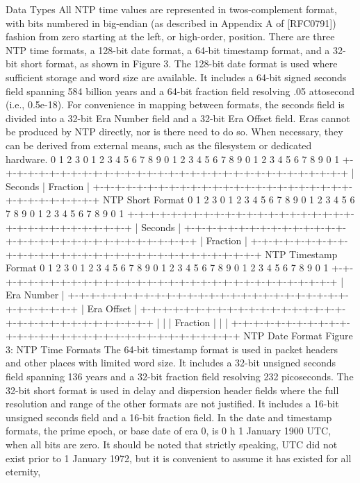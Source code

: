  Data Types
 All NTP time values are represented in twos-complement format, with
 bits numbered in big-endian (as described in Appendix A of [RFC0791])
 fashion from zero starting at the left, or high-order, position.
 There are three NTP time formats, a 128-bit date format, a 64-bit
 timestamp format, and a 32-bit short format, as shown in Figure 3.
 The 128-bit date format is used where sufficient storage and word
 size are available. It includes a 64-bit signed seconds field
 spanning 584 billion years and a 64-bit fraction field resolving .05
 attosecond (i.e., 0.5e-18). For convenience in mapping between
 formats, the seconds field is divided into a 32-bit Era Number field
 and a 32-bit Era Offset field. Eras cannot be produced by NTP
 directly, nor is there need to do so. When necessary, they can be
 derived from external means, such as the filesystem or dedicated
 hardware.
0 1 2 3
 0 1 2 3 4 5 6 7 8 9 0 1 2 3 4 5 6 7 8 9 0 1 2 3 4 5 6 7 8 9 0 1
 +-+-+-+-+-+-+-+-+-+-+-+-+-+-+-+-+-+-+-+-+-+-+-+-+-+-+-+-+-+-+-+-+
 | Seconds | Fraction |
 +-+-+-+-+-+-+-+-+-+-+-+-+-+-+-+-+-+-+-+-+-+-+-+-+-+-+-+-+-+-+-+-+
 NTP Short Format
 0 1 2 3
 0 1 2 3 4 5 6 7 8 9 0 1 2 3 4 5 6 7 8 9 0 1 2 3 4 5 6 7 8 9 0 1
 +-+-+-+-+-+-+-+-+-+-+-+-+-+-+-+-+-+-+-+-+-+-+-+-+-+-+-+-+-+-+-+-+
 | Seconds |
 +-+-+-+-+-+-+-+-+-+-+-+-+-+-+-+-+-+-+-+-+-+-+-+-+-+-+-+-+-+-+-+-+
 | Fraction |
 +-+-+-+-+-+-+-+-+-+-+-+-+-+-+-+-+-+-+-+-+-+-+-+-+-+-+-+-+-+-+-+-+
 NTP Timestamp Format
 0 1 2 3
 0 1 2 3 4 5 6 7 8 9 0 1 2 3 4 5 6 7 8 9 0 1 2 3 4 5 6 7 8 9 0 1
 +-+-+-+-+-+-+-+-+-+-+-+-+-+-+-+-+-+-+-+-+-+-+-+-+-+-+-+-+-+-+-+-+
 | Era Number |
 +-+-+-+-+-+-+-+-+-+-+-+-+-+-+-+-+-+-+-+-+-+-+-+-+-+-+-+-+-+-+-+-+
 | Era Offset |
 +-+-+-+-+-+-+-+-+-+-+-+-+-+-+-+-+-+-+-+-+-+-+-+-+-+-+-+-+-+-+-+-+
 | |
 | Fraction |
 | |
 +-+-+-+-+-+-+-+-+-+-+-+-+-+-+-+-+-+-+-+-+-+-+-+-+-+-+-+-+-+-+-+-+
 NTP Date Format
 Figure 3: NTP Time Formats
 The 64-bit timestamp format is used in packet headers and other
 places with limited word size. It includes a 32-bit unsigned seconds
 field spanning 136 years and a 32-bit fraction field resolving 232
 picoseconds. The 32-bit short format is used in delay and dispersion
 header fields where the full resolution and range of the other
 formats are not justified. It includes a 16-bit unsigned seconds
 field and a 16-bit fraction field.
 In the date and timestamp formats, the prime epoch, or base date of
 era 0, is 0 h 1 January 1900 UTC, when all bits are zero. It should
 be noted that strictly speaking, UTC did not exist prior to 1 January
 1972, but it is convenient to assume it has existed for all eternity,
